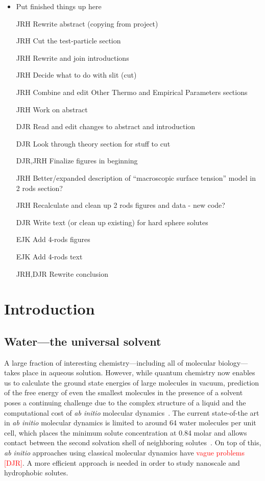 \documentclass[letterpaper,twocolumn,amsmath,amssymb,prb]{revtex4-1}
\begin{document}
{\begin{itemize}
\color{blue}
\item Put finished things up here
\item[JRH] Rewrite abstract (copying from project)
\item[JRH] Cut the test-particle section
\item[JRH] Rewrite and join introductions
\item[JRH] Decide what to do with slit (cut)
\item[JRH] Combine and edit Other Thermo and Empirical Parameters sections
\color{red}
\item[JRH] Work on abstract
\item[DJR] Read and edit changes to abstract and introduction
\item[DJR] Look through theory section for stuff to cut
\item[DJR,JRH] Finalize figures in beginning
\item[JRH] Better/expanded description of ``macroscopic surface tension'' model in 2 rods section?
\item[JRH] Recalculate and clean up 2 rods figures and data - new code?
\item[DJR] Write text (or clean up existing) for hard sphere solutes
\item[EJK] Add 4-rods figures
\item[EJK] Add 4-rods text
\item[JRH,DJR] Rewrite conclusion
\end{itemize}
}


\section{Introduction}

\subsection{Water---the universal solvent}

A large fraction of interesting chemistry---including all of molecular
biology---takes place in aqueous solution.  However, while quantum
chemistry now enables us to calculate the ground state energies of
large molecules in vacuum, prediction of the free energy of even the
smallest molecules in the presence of a solvent poses a continuing
challenge due to the complex structure of a liquid and the
computational cost of \emph{ab initio} molecular
dynamics~\cite{car1985, grossman2004}.  The current state-of-the art
in \emph{ab initio} molecular dynamics is limited to around 64 water
molecules per unit cell, which places the minimum solute concentration
at 0.84 molar and allows contact between the second solvation shell of
neighboring solutes~\cite{izvekov2005, choe2007}.  On top of this,
\emph{ab initio} approaches using classical molecular dynamics have
\textcolor{red}{vague problems [DJR]}\cite{weber2010ab-initio-water}.  A
more efficient approach is needed in order to study nanoscale and
hydrophobic solutes.
\end{document}
